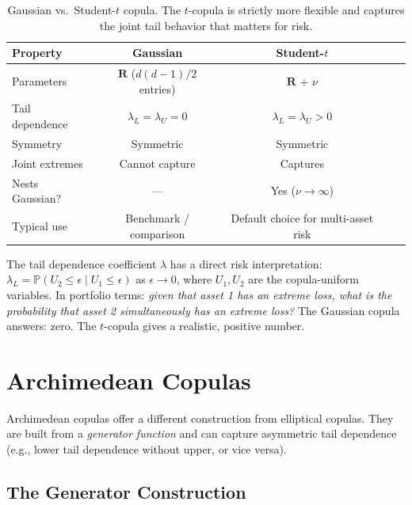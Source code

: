 \documentclass[11pt, a4paper]{article}
\theoremstyle{definition}
\theoremstyle{plain}
\theoremstyle{remark}
\newcommand{\PV}{\mathbb{P}}
\begin{document}
\begin{table}[H]
\centering
\begin{tabular}{@{}lcccc@{}}
\toprule
\textbf{Property} & \textbf{Gaussian} & \textbf{Student-$t$} \\
\midrule
Parameters & $\bm{R}$ ($d(d-1)/2$ entries) & $\bm{R}$ + $\nu$ \\
Tail dependence & $\lambda_L = \lambda_U = 0$ & $\lambda_L = \lambda_U > 0$ \\
Symmetry & Symmetric & Symmetric \\
Joint extremes & Cannot capture & Captures \\
Nests Gaussian? & --- & Yes ($\nu \to \infty$) \\
Typical use & Benchmark / comparison & Default choice for multi-asset risk \\
\bottomrule
\end{tabular}
\caption{Gaussian vs.\ Student-$t$ copula.
The $t$-copula is strictly more flexible and captures the joint tail behavior
that matters for risk.}
\end{table}

\begin{keyresult}
The tail dependence coefficient $\lambda$ has a direct risk interpretation:
$\lambda_L = \PV(U_2 \leq \epsilon \mid U_1 \leq \epsilon)$ as $\epsilon \to 0$,
where $U_1, U_2$ are the copula-uniform variables.
In portfolio terms: \emph{given that asset 1 has an extreme loss,
what is the probability that asset 2 simultaneously has an extreme loss?}
The Gaussian copula answers: zero.
The $t$-copula gives a realistic, positive number.
\end{keyresult}

\section{Archimedean Copulas}
\label{sec:archimedean}

Archimedean copulas offer a different construction from elliptical copulas.
They are built from a \emph{generator function} and can capture asymmetric tail dependence
(e.g., lower tail dependence without upper, or vice versa).

\subsection{The Generator Construction}
\end{document}
